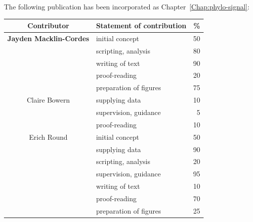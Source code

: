 \cleartoevenpage
\pagestyle{empty}	

\noindent
The following publication has been incorporated as Chapter~\ref{Chap:phylo-signal}:\\

\noindent
{}

\begin{table}[h]
	\centering
	\begin{tabular}{clr}
		\toprule
		Contributor & Statement of contribution & \% \\
		\midrule
		\textbf{Jayden Macklin-Cordes}	& initial concept			& 50 \\
		                                & scripting, analysis       & 80 \\
		                                & writing of text 			& 90 \\
										& proof-reading				& 20 \\
										& preparation of figures 	& 75 \\
		\midrule
		Claire Bowern                   & supplying data            & 10 \\
										& supervision, guidance 	& 5  \\
										& proof-reading             & 10 \\
		\midrule
		Erich Round 					& initial concept			& 50 \\
		                                & supplying data            & 90 \\
		                                & scripting, analysis       & 20 \\
		                                & supervision, guidance 	& 95 \\
		                                & writing of text 			& 10 \\
										& proof-reading				& 70 \\
										& preparation of figures 	& 25 \\
										
		\bottomrule
	\end{tabular}
\end{table}

